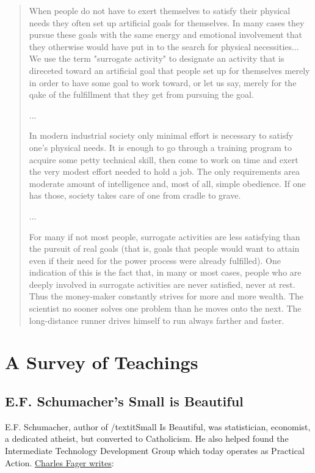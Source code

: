 \documentclass[10pt,letterpaper,openany]{book}
\begin{document}
\begin{quote}
When people do not have to exert themselves to satisfy their physical needs they often set up artificial goals for themselves. In many cases they pursue these goals with the same energy and emotional involvement that they otherwise would have put in to the search for physical necessities... We use the term "surrogate activity" to designate an activity that is direceted toward an artificial goal that people set up for themselves merely in order to have some goal to work toward, or let us say, merely for the qake of the fulfillment that they get from pursuing the goal.

...

In modern industrial society only minimal effort is necessary to satisfy one's physical needs. It is enough to go through a training program to acquire some petty technical skill, then come to work on time and exert the very modest effort needed to hold a job. The only requirements area moderate amount of intelligence and, most of all, simple obedience. If one has those, society takes care of one from cradle to grave.

...

For many if not most people, surrogate activities are less satisfying than the pursuit of real goals (that is, goals that people would want to attain even if their need for the power process were already fulfilled). One indication of this is the fact that, in many or most cases, people who are deeply involved in surrogate activities are never satisfied, never at rest. Thus the money-maker constantly strives for more and more wealth. The scientist no sooner solves one problem than he moves onto the next. The long-distance runner drives himself to run always farther and faster.
\end{quote}

\fi

\section{A Survey of Teachings}

\subsection{E.F. Schumacher's Small is Beautiful}

E.F. Schumacher, author of /textit{Small Is Beautiful}, was statistician, economist, a dedicated atheist, but converted to Catholicism. He also helped found the Intermediate Technology Development Group which today operates as Practical Action. \href{https://www.religion-online.org/article/small-is-beautiful-and-so-is-rome-surprising-faith-of-e-f-schumacher/}{Charles Fager writes}:
\end{document}
